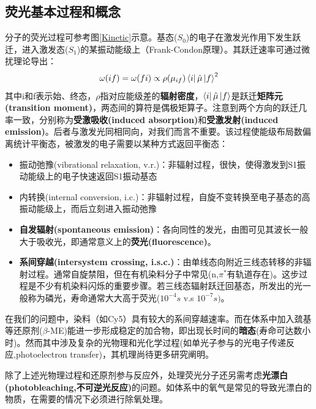 \documentclass[12pt]{ctexart}%
\begin{document}
\subsection*{荧光基本过程和概念}
\par 分子的荧光过程可参考图\ref{Kinetic}示意。基态($S_0$)的电子在激发光作用下发生跃迁，进入激发态($S_1$)的某振动能级上（Frank-Condon原理）。其跃迁速率可通过微扰理论导出：
\begin{equation}
    \omega(if)=\omega(fi)\propto \rho(\mu_{if})\bra{i}\hat{\mu}\ket{f}^2
    \label{pert}
\end{equation}
其中i和f表示始、终态，$\rho$指对应能级差的\textbf{辐射密度}，$\bra{i}\hat{\mu}\ket{f}$是跃迁\textbf{矩阵元(transition moment)}，两态间的算符是偶极矩算子。注意到两个方向的跃迁几率一致，分别称为\textbf{受激吸收(induced absorption)}和\textbf{受激发射(induced emission)}。后者与激发光同相同向，对我们而言不重要。该过程使能级布局数偏离统计平衡态，被激发的电子需要以某种方式返回平衡态：
\begin{itemize}
    \item 振动弛豫(vibrational relaxation, v.r.)：非辐射过程，很快，使得激发到S1振动能级上的电子快速返回S1振动基态
    \item 内转换(internal conversion, i.c.)：非辐射过程，自旋不变转换至电子基态的高振动能级上，而后立刻进入振动弛豫
    \item \textbf{自发辐射(spontaneous emission)}：各向同性的发光，由图可见其波长一般大于吸收光，即通常意义上的\textbf{荧光(fluorescence)}。
    \item \textbf{系间穿越(intersystem crossing, i.s.c.)}：由单线态向附近三线态转移的非辐射过程。通常自旋禁阻，但在有机染料分子中常见(n,$\pi^*有轨道存在$)。这步过程是不少有机染料闪烁的重要步骤。若三线态辐射跃迁回基态，所发出的光一般称为磷光，寿命通常大大高于荧光($10^{-4}s$ v.s $10^{-7}s)$。
\end{itemize}
在我们的问题中，染料（如Cy5）具有较大的系间穿越速率。而在体系中加入巯基等还原剂($\beta$-ME)能进一步形成稳定的加合物，即出现长时间的\textbf{暗态}(寿命可达数小时)。然而其中涉及复杂的光物理和光化学过程(如单光子参与的光电子传递反应,photoelectron transfer)，其机理尚待更多研究阐明。
\par 除了上述光物理过程和还原剂参与反应外，处理荧光分子还另需考虑\textbf{光漂白(photobleaching,不可逆光反应)}的问题。如体系中的氧气是常见的导致光漂白的物质，在需要的情况下必须进行除氧处理。
\end{document}
